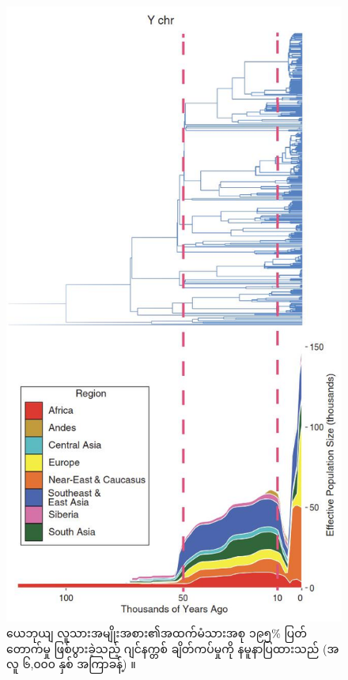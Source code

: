 \documentclass[10pt,twocolumn,letterpaper]{article}
\begin{document}
\begin{figure}[b]
\begin{center}
   \includegraphics[width=1\linewidth]{bottleneck.jpg}
\end{center}
   \caption{ယေဘုယျ လူသားအမျိုးအစား၏အထက်မံသားအစု ၁၉၅\% ပြတ်တောက်မှု ဖြစ်ပွားခဲ့သည့် ဂျင်နက္တစ် ချိတ်ကပ်မှုကို နမူနာပြထားသည် (အ​လူ ၆,၀၀၀ နှစ် အကြာခန့်) \cite{62}။}
\label{fig:10}
\label{fig:onecol}
\end{figure}
\end{document}
